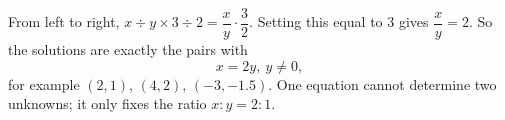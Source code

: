 From left to right, $x\div y\times3\div2=\dfrac xy\cdot\dfrac32$. Setting this equal to $3$ gives $\dfrac xy=2$. So the solutions are exactly the pairs with
\[\boxed{x=2y,\ y\ne0},\]
for example $(2,1)$, $(4,2)$, $(-3,-1.5)$. One equation cannot determine two unknowns; it only fixes the ratio $x:y=2:1$.
